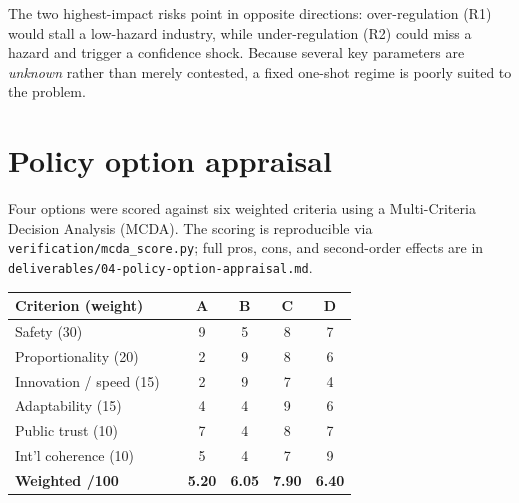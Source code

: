 \documentclass[11pt,a4paper]{article}
\begin{document}
The two highest-impact risks point in opposite directions: over-regulation (R1)
would stall a low-hazard industry, while under-regulation (R2) could miss a
hazard and trigger a confidence shock. Because several key parameters are
\emph{unknown} rather than merely contested, a fixed one-shot regime is poorly
suited to the problem.

\section{Policy option appraisal}

Four options were scored against six weighted criteria using a Multi-Criteria
Decision Analysis (MCDA). The scoring is reproducible via
\texttt{verification/mcda\_score.py}; full pros, cons, and second-order effects
are in \texttt{deliverables/04-policy-option-appraisal.md}.

\begin{center}
\small
\begin{tabularx}{\linewidth}{@{}lXcccc@{}}
\toprule
\textbf{Criterion (weight)} & & \textbf{A} & \textbf{B} & \textbf{C} & \textbf{D} \\
\midrule
Safety (30)            & & 9 & 5 & 8 & 7 \\
Proportionality (20)   & & 2 & 9 & 8 & 6 \\
Innovation / speed (15)& & 2 & 9 & 7 & 4 \\
Adaptability (15)      & & 4 & 4 & 9 & 6 \\
Public trust (10)      & & 7 & 4 & 8 & 7 \\
Int'l coherence (10)   & & 5 & 4 & 7 & 9 \\
\midrule
\textbf{Weighted /100} & & \textbf{5.20} & \textbf{6.05} & \textbf{7.90} & \textbf{6.40} \\
\bottomrule
\end{tabularx}
\end{center}
\end{document}

